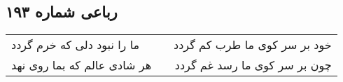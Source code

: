 \begin{center}
\section*{رباعی شماره ۱۹۳}
\label{sec:sh193}
\begin{longtable}{l p{0.5cm} r}
ما را نبود دلی که خرم گردد
&&
خود بر سر کوی ما طرب کم گردد
\\
هر شادی عالم که بما روی نهد
&&
چون بر سر کوی ما رسد غم گردد
\\
\end{longtable}
\end{center}
